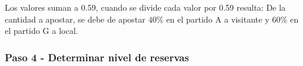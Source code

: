 \begin{table}[ht]
\centering
{}
\caption{Escogiendo apuestas que vale la pena realizar}
\label{proporcion}
\end{table}


Los valores suman a 0.59, cuando se divide cada valor por 0.59 resulta: De la cantidad a apostar, se debe de apostar $40 \%$ en el partido A a visitante y $60 \%$ en el partido G a local.


\subsubsection{Paso 4 - Determinar nivel de reservas}



